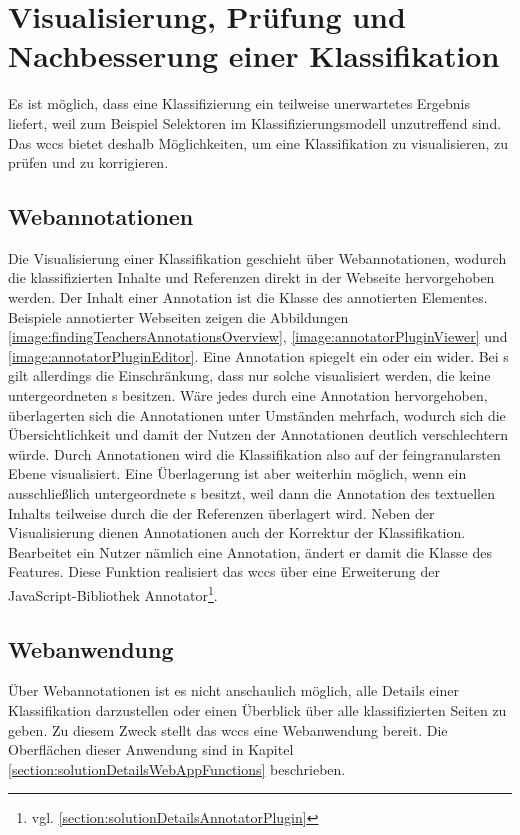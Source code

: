 \section{Visualisierung, Prüfung und Nachbesserung einer Klassifikation}
    \label{section:conceptVisualization}
    Es ist möglich, dass eine Klassifizierung ein teilweise unerwartetes Ergebnis liefert,
    weil zum Beispiel Selektoren im Klassifizierungsmodell unzutreffend sind.
    Das \gls{wccs} bietet deshalb Möglichkeiten,
    um eine Klassifikation zu visualisieren, zu prüfen und zu korrigieren.

    \subsection{Webannotationen}
        \label{section:conceptWebAnnotations}
        Die Visualisierung einer Klassifikation geschieht über Webannotationen,
        wodurch die klassifizierten Inhalte und Referenzen direkt in der Webseite hervorgehoben werden.
        Der Inhalt einer Annotation ist die Klasse des annotierten Elementes.
        Beispiele annotierter Webseiten zeigen die Abbildungen
        \ref{image:findingTeachersAnnotationsOverview},
        \ref{image:annotatorPluginViewer} und \ref{image:annotatorPluginEditor}.
        Eine Annotation spiegelt ein {} oder ein
        {\contentFeature} wider.
        Bei {\contentFeature}s gilt allerdings die Einschränkung,
        dass nur solche visualisiert werden,
        die keine untergeordneten {\contentFeature}s besitzen.
        Wäre jedes {\contentFeature} durch eine Annotation hervorgehoben,
        überlagerten sich die Annotationen unter Umständen mehrfach,
        wodurch sich die Übersichtlichkeit
        und damit der Nutzen der Annotationen deutlich verschlechtern würde.
        Durch Annotationen wird die Klassifikation also auf der feingranularsten Ebene visualisiert.
        Eine Überlagerung ist aber weiterhin möglich,
        wenn ein {\contentFeature} ausschließlich untergeordnete {}s besitzt,
        weil dann die Annotation des textuellen Inhalts teilweise durch die
        der Referenzen überlagert wird.
        Neben der Visualisierung dienen Annotationen auch der Korrektur der Klassifikation.
        Bearbeitet ein Nutzer nämlich eine Annotation,
        ändert er damit die Klasse des Features.
        Diese Funktion realisiert das \gls{wccs} über eine Erweiterung der JavaScript-Bibliothek
        Annotator\footnote{vgl. \ref{section:solutionDetailsAnnotatorPlugin}}.
    
    \subsection{Webanwendung}
        \label{section:solutionConceptWebApp}
        Über Webannotationen ist es nicht anschaulich möglich, alle Details einer Klassifikation darzustellen
        oder einen Überblick über alle klassifizierten Seiten zu geben.
        Zu diesem Zweck stellt das \gls{wccs} eine Webanwendung bereit.
        Die Oberflächen dieser Anwendung sind in Kapitel \ref{section:solutionDetailsWebAppFunctions}
        beschrieben.
